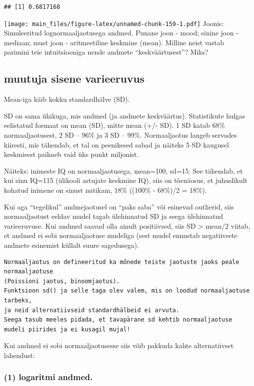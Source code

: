 \documentclass[]{book}
\begin{document}
\begin{verbatim}
## [1] 0.6817168
\end{verbatim}

\texttt{[image: main\_files/figure-latex/unnamed-chunk-159-1.pdf]}
Joonis: Simuleeritud lognormaaljaotusega andmed. Punane joon - mood;
sinine joon - mediaan; must joon - aritmeetiline keskmine (mean).
Milline neist vastab parimini teie intuitsiooniga nende andmete
``keskväärtusest''? Miks?

\subsection{muutuja sisene
varieeruvus}\label{muutuja-sisene-varieeruvus}

Mean-iga käib kokku standardhälve (SD).

SD on sama ühikuga, mis andmed (ja andmete keskväärtus). Statistikute
hulgas eelistatud formaat on mean (SD), mitte mean (+/- SD). 1 SD katab
68\% normaaljaotusest, 2 SD -- 96\% ja 3 SD -- 99\%. Normaaljaotus
langeb servades kiiresti, mis tähendab, et tal on peenikesed sabad ja
näiteks 5 SD kaugusel keskmisest paikneb vaid üks punkt miljonist.

Näiteks: inimeste IQ on normaaljaotusega, mean=100, sd=15. See tähendab,
et kui sinu IQ=115 (ülikooli astujate keskmine IQ), siis on tõenäosus,
et juhuslikult kohatud inimene on sinust nutikam, 18\% ((100\% - 68\%)/2
= 18\%).

Kui aga ``tegelikul'' andmejaotusel on ``paks saba'' või esinevad
outlierid, siis normaaljaotust eeldav mudel tagab ülehinnatud SD ja
seega ülehinnatud varieeruvuse. Kui andmed saavad olla ainult
positiivsed, siis SD \textgreater{} mean/2 viitab, et andmed ei sobi
normaaljaotuse mudeliga (sest mudel ennustab negatiivsete andmete
esinemist küllalt suure sagedusega).

\begin{verbatim}
Normaaljaotus on defineeritud ka mõnede teiste jaotuste jaoks peale normaaljaotuse 
(Poissioni jaotus, binoomjaotus). 
Funktsioon sd() ja selle taga olev valem, mis on loodud normaaljaotuse tarbeks, 
ja neid alternatiivseid standardhälbeid ei arvuta. 
Seega tasub meeles pidada, et tavapärane sd kehtib normaaljaotuse mudeli piirides ja ei kusagil mujal!
\end{verbatim}

Kui andmed ei sobi normaaljaotusesse siis võib pakkuda kahte
alternatiivset lahendust:

\subsubsection{(1) logaritmi andmed.}\label{logaritmi-andmed.}
\end{document}
